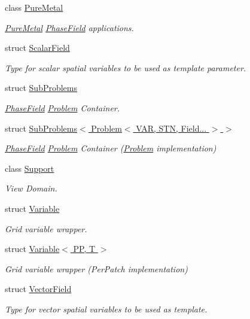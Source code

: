 \begin{DoxyCompactItemize}
class \hyperlink{classUintah_1_1PhaseField_1_1PureMetal}{Pure\+Metal}
\begin{DoxyCompactList}\small\item\em \hyperlink{classUintah_1_1PhaseField_1_1PureMetal}{Pure\+Metal} \hyperlink{namespaceUintah_1_1PhaseField}{Phase\+Field} applications. \end{DoxyCompactList}\item 
struct \hyperlink{structUintah_1_1PhaseField_1_1ScalarField}{Scalar\+Field}
\begin{DoxyCompactList}\small\item\em Type for scalar spatial variables to be used as template parameter. \end{DoxyCompactList}\item 
struct \hyperlink{structUintah_1_1PhaseField_1_1SubProblems}{Sub\+Problems}
\begin{DoxyCompactList}\small\item\em \hyperlink{namespaceUintah_1_1PhaseField}{Phase\+Field} \hyperlink{classUintah_1_1PhaseField_1_1Problem}{Problem} Container. \end{DoxyCompactList}\item 
struct \hyperlink{structUintah_1_1PhaseField_1_1SubProblems_3_01Problem_3_01VAR_00_01STN_00_01Field_8_8_8_01_4_01_4}{Sub\+Problems$<$ Problem$<$ V\+A\+R, S\+T\+N, Field... $>$ $>$}
\begin{DoxyCompactList}\small\item\em \hyperlink{namespaceUintah_1_1PhaseField}{Phase\+Field} \hyperlink{classUintah_1_1PhaseField_1_1Problem}{Problem} Container (\hyperlink{classUintah_1_1PhaseField_1_1Problem}{Problem} implementation) \end{DoxyCompactList}\item 
class \hyperlink{classUintah_1_1PhaseField_1_1Support}{Support}
\begin{DoxyCompactList}\small\item\em View Domain. \end{DoxyCompactList}\item 
struct \hyperlink{structUintah_1_1PhaseField_1_1Variable}{Variable}
\begin{DoxyCompactList}\small\item\em Grid variable wrapper. \end{DoxyCompactList}\item 
struct \hyperlink{structUintah_1_1PhaseField_1_1Variable_3_01PP_00_01T_01_4}{Variable$<$ P\+P, T $>$}
\begin{DoxyCompactList}\small\item\em Grid variable wrapper (Per\+Patch implementation) \end{DoxyCompactList}\item 
struct \hyperlink{structUintah_1_1PhaseField_1_1VectorField}{Vector\+Field}
\begin{DoxyCompactList}\small\item\em Type for vector spatial variables to be used as template. \end{DoxyCompactList}\end{DoxyCompactItemize}
